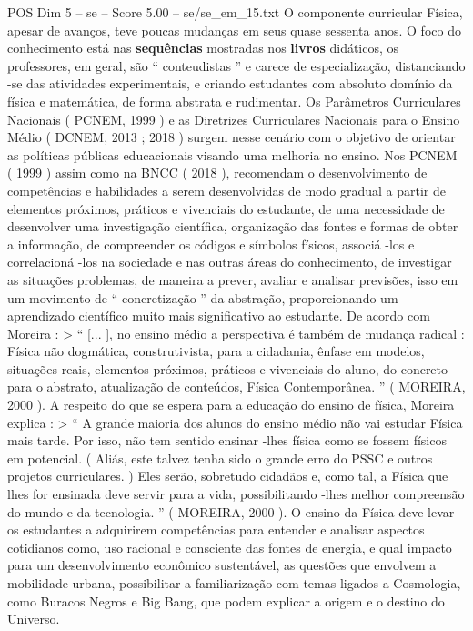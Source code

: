 \begin{textsample}{POS Dim 5 – se – Score 5.00 – se/se\_em\_15.txt}
O componente curricular Física, apesar de avanços, teve poucas mudanças em seus quase sessenta anos.
O foco do conhecimento está nas \textbf{sequências} mostradas nos \textbf{livros} didáticos, os professores, em geral, são “ conteudistas ” e carece de especialização, distanciando -se das atividades experimentais, e criando estudantes com absoluto domínio da física e matemática, de forma abstrata e rudimentar.
Os Parâmetros Curriculares Nacionais ( PCNEM, 1999 ) e as Diretrizes Curriculares Nacionais para o Ensino Médio ( DCNEM, 2013 ; 2018 ) surgem nesse cenário com o objetivo de orientar as políticas públicas educacionais visando uma melhoria no ensino.
Nos PCNEM ( 1999 ) assim como na BNCC ( 2018 ), recomendam o desenvolvimento de competências e habilidades a serem desenvolvidas de modo gradual a partir de elementos próximos, práticos e vivenciais do estudante, de uma necessidade de desenvolver uma investigação científica, organização das fontes e formas de obter a informação, de compreender os códigos e símbolos físicos, associá -los e correlacioná -los na sociedade e nas outras áreas do conhecimento, de investigar as situações problemas, de maneira a prever, avaliar e analisar previsões, isso em um movimento de “ concretização ” da abstração, proporcionando um aprendizado científico muito mais significativo ao estudante.
De acordo com Moreira : > “ [... ], no ensino médio a perspectiva é também de mudança radical : Física não dogmática, construtivista, para a cidadania, ênfase em modelos, situações reais, elementos próximos, práticos e vivenciais do aluno, do concreto para o abstrato, atualização de conteúdos, Física Contemporânea. ” ( MOREIRA, 2000 ).
A respeito do que se espera para a educação do ensino de física, Moreira explica : > “ A grande maioria dos alunos do ensino médio não vai estudar Física mais tarde.
Por isso, não tem sentido ensinar -lhes física como se fossem físicos em potencial. ( Aliás, este talvez tenha sido o grande erro do PSSC e outros projetos curriculares. ) Eles serão, sobretudo cidadãos e, como tal, a Física que lhes for ensinada deve servir para a vida, possibilitando -lhes melhor compreensão do mundo e da tecnologia. ” ( MOREIRA, 2000 ).
O ensino da Física deve levar os estudantes a adquirirem competências para entender e analisar aspectos cotidianos como, uso racional e consciente das fontes de energia, e qual impacto para um desenvolvimento econômico sustentável, as questões que envolvem a mobilidade urbana, possibilitar a familiarização com temas ligados a Cosmologia, como Buracos Negros e Big Bang, que podem explicar a origem e o destino do Universo.

\end{textsample}
